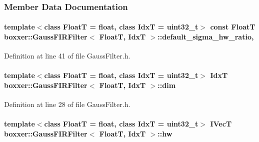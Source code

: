 \subsubsection{Member Data Documentation}
\paragraph[{\texorpdfstring{default\+\_\+sigma\+\_\+hw\+\_\+ratio}{default_sigma_hw_ratio}}]{\setlength{\rightskip}{0pt plus 5cm}template$<$class FloatT = float, class IdxT = uint32\+\_\+t$>$ const FloatT {\bf boxxer\+::\+Gauss\+F\+I\+R\+Filter}$<$ FloatT, IdxT $>$\+::default\+\_\+sigma\+\_\+hw\+\_\+ratio\hspace{0.3cm}{\ttfamily [static]}, {\ttfamily [protected]}}\hypertarget{classboxxer_1_1GaussFIRFilter_a72b51cd7549510735179cb9c94f5f43f}{}\label{classboxxer_1_1GaussFIRFilter_a72b51cd7549510735179cb9c94f5f43f}


Definition at line 41 of file Gauss\+Filter.\+h.

\paragraph[{\texorpdfstring{dim}{dim}}]{\setlength{\rightskip}{0pt plus 5cm}template$<$class FloatT = float, class IdxT = uint32\+\_\+t$>$ IdxT {\bf boxxer\+::\+Gauss\+F\+I\+R\+Filter}$<$ FloatT, IdxT $>$\+::dim}\hypertarget{classboxxer_1_1GaussFIRFilter_ac7adcd4d8f8efee00a65262f596c8eda}{}\label{classboxxer_1_1GaussFIRFilter_ac7adcd4d8f8efee00a65262f596c8eda}


Definition at line 28 of file Gauss\+Filter.\+h.

\paragraph[{\texorpdfstring{hw}{hw}}]{\setlength{\rightskip}{0pt plus 5cm}template$<$class FloatT = float, class IdxT = uint32\+\_\+t$>$ {\bf I\+VecT} {\bf boxxer\+::\+Gauss\+F\+I\+R\+Filter}$<$ FloatT, IdxT $>$\+::hw}\hypertarget{classboxxer_1_1GaussFIRFilter_ae17a4e137303e452a9223ba34825e0da}{}\label{classboxxer_1_1GaussFIRFilter_ae17a4e137303e452a9223ba34825e0da}



